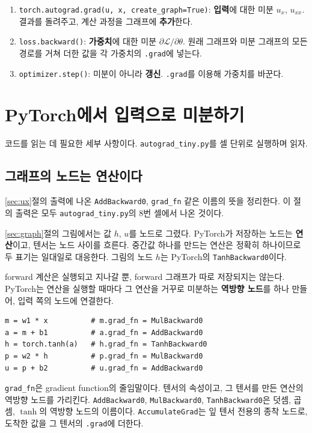 \documentclass[11pt,a4paper]{article}
\newcommand{\loss}{\mathcal{L}}
\begin{document}
\begin{keybox}
\begin{enumerate}[leftmargin=1.5em]
\item \texttt{torch.autograd.grad(u, x, create\_graph=True)}: \textbf{입력}에 대한 미분 $u_x$, $u_{xx}$. 결과를 돌려주고, 계산 과정을 그래프에 \textbf{추가}한다.
\item \texttt{loss.backward()}: \textbf{가중치}에 대한 미분 $\partial\loss/\partial\theta$. 원래 그래프와 미분 그래프의 모든 경로를 거쳐 더한 값을 각 가중치의 \texttt{.grad}에 넣는다.
\item \texttt{optimizer.step()}: 미분이 아니라 \textbf{갱신}. \texttt{.grad}를 이용해 가중치를 바꾼다.
\end{enumerate}
\end{keybox}

\section{PyTorch에서 입력으로 미분하기}\label{sec:torch}

코드를 읽는 데 필요한 세부 사항이다. \texttt{autograd\_tiny.py}를 셀 단위로 실행하며 읽자.

\subsection{그래프의 노드는 연산이다}\label{sec:nodes}

\ref{sec:ux}절의 출력에 나온 \texttt{AddBackward0}, \texttt{grad\_fn} 같은 이름의 뜻을 정리한다.
이 절의 출력은 모두 \texttt{autograd\_tiny.py}의 8번 셀에서 나온 것이다.

\ref{sec:graph}절의 그림에서는 값 $h$, $u$를 노드로 그렸다. PyTorch가 저장하는 노드는 \textbf{연산}이고, 텐서는 노드 사이를 흐른다.
중간값 하나를 만드는 연산은 정확히 하나이므로 두 표기는 일대일로 대응한다. 그림의 노드 $h$는 PyTorch의 \texttt{TanhBackward0}이다.

forward 계산은 실행되고 지나갈 뿐, forward 그래프가 따로 저장되지는 않는다.
PyTorch는 연산을 실행할 때마다 그 연산을 거꾸로 미분하는 \textbf{역방향 노드}를 하나 만들어, 입력 쪽의 노드에 연결한다.
\begin{lstlisting}
m = w1 * x          # m.grad_fn = MulBackward0
a = m + b1          # a.grad_fn = AddBackward0
h = torch.tanh(a)   # h.grad_fn = TanhBackward0
p = w2 * h          # p.grad_fn = MulBackward0
u = p + b2          # u.grad_fn = AddBackward0
\end{lstlisting}
\texttt{grad\_fn}은 gradient function의 줄임말이다. 텐서의 속성이고, 그 텐서를 만든 연산의 역방향 노드를 가리킨다.
\texttt{AddBackward0}, \texttt{MulBackward0}, \texttt{TanhBackward0}은 덧셈, 곱셈, $\tanh$의 역방향 노드의 이름이다.
\texttt{AccumulateGrad}는 잎 텐서 전용의 종착 노드로, 도착한 값을 그 텐서의 \texttt{.grad}에 더한다.
\end{document}
